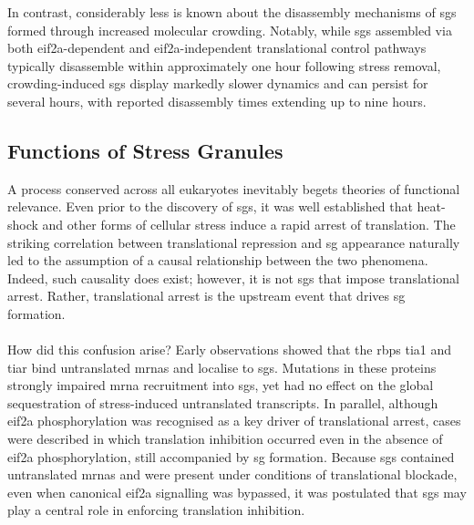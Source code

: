 In contrast, considerably less is known about the disassembly mechanisms of \glspl{sg} formed  through increased molecular crowding. Notably, while \glspl{sg} assembled via both \gls{eif2a}-dependent and \gls{eif2a}-independent translational control pathways typically disassemble within approximately one hour following stress removal\cite{bounedjah_macromolecular_2012}, crowding-induced \glspl{sg} display markedly slower dynamics and can persist for several hours, with reported disassembly times extending up to nine hours\cite{bounedjah_macromolecular_2012}.

\subsection{Functions of Stress Granules}

A process conserved across all eukaryotes inevitably begets theories of functional relevance. Even prior to the discovery of \glspl{sg}, it was well established that heat-shock and other forms of cellular stress induce a rapid arrest of translation\cite{storti_translational_1980, didomenico_heat_1982, nover_formation_1983}. The striking correlation between translational repression and \gls{sg} appearance naturally led to the assumption of a causal relationship between the two phenomena\cite{kedersha_rna-binding_1999}. Indeed, such causality does exist; however, it is not \glspl{sg} that impose translational arrest. Rather, translational arrest is the upstream event that drives \gls{sg} formation\cite{anderson_visibly_2002}.
\\
\\
How did this confusion arise? Early observations showed that the \glspl{rbp} \gls{tia1} and \gls{tiar} bind untranslated \glspl{mrna} and localise to \glspl{sg}\cite{kedersha_rna-binding_1999}. Mutations in these proteins strongly impaired \gls{mrna} recruitment into \glspl{sg}, yet had no effect on the global sequestration of stress-induced untranslated transcripts\cite{kedersha_rna-binding_1999}. In parallel, although \gls{eif2a} phosphorylation was recognised as a key driver of translational arrest, cases were described in which translation inhibition occurred even in the absence of \gls{eif2a} phosphorylation\cite{duncan_protein_1989}, still accompanied by \gls{sg} formation\cite{kedersha_rna-binding_1999}. Because \glspl{sg} contained untranslated \glspl{mrna} and were present under conditions of translational blockade, even when canonical \gls{eif2a} signalling was bypassed, it was postulated that \glspl{sg} may play a central role in enforcing translation inhibition\cite{kedersha_rna-binding_1999}.
